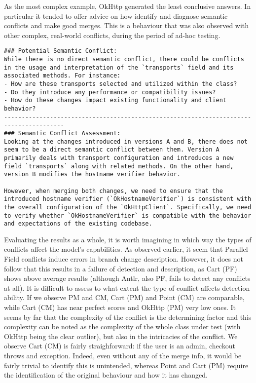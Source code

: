 As the most complex example, OkHttp generated the least conclusive answers. In particular it tended to offer advice on how identify and diagnose semantic conflicts and make good merges. This is a behaviour that was also observed with other complex, real-world conflicts, during the period of ad-hoc testing.
\begin{lstlisting}
### Potential Semantic Conflict:
While there is no direct semantic conflict, there could be conflicts in the usage and interpretation of the `transports` field and its associated methods. For instance:
- How are these transports selected and utilized within the class?
- Do they introduce any performance or compatibility issues?
- How do these changes impact existing functionality and client behavior?
---------------------------------------------------------------------------------------
### Semantic Conflict Assessment:
Looking at the changes introduced in versions A and B, there does not seem to be a direct semantic conflict between them. Version A primarily deals with transport configuration and introduces a new field `transports` along with related methods. On the other hand, version B modifies the hostname verifier behavior.

However, when merging both changes, we need to ensure that the introduced hostname verifier (`OkHostnameVerifier`) is consistent with the overall configuration of the `OkHttpClient`. Specifically, we need to verify whether `OkHostnameVerifier` is compatible with the behavior and expectations of the existing codebase.
\end{lstlisting}

Evaluating the results as a whole, it is worth imagining in which way the types of conflicts affect the model's capabilities. As observed earlier, it seem that Parallel Field conflicts induce errors in branch change description. However, it does not follow that this results in a failure of detection and description, as Cart (PF) shows above average results (although Antlr, also PF, fails to detect any conflicts at all). 
It is difficult to assess to what extent the type of conflict affects detection ability. If we observe PM and CM, Cart (PM) and Point (CM) are comparable, while Cart (CM) has near perfect scores and OkHttp (PM) very low ones.
It seems by far that the complexity of the conflict is the determining factor and this complexity can be noted as the complexity of the whole class under test (with OkHttp being the clear outlier), but also in the intricacies of the conflict.
We observe Cart (CM) is fairly straighforward: if the user is an admin, checkout throws and exception. Indeed, even without any of the merge info, it would be fairly trivial to identify this is unintended, whereas
Point and Cart (PM) require the identification of the original behaviour and how it has changed.

